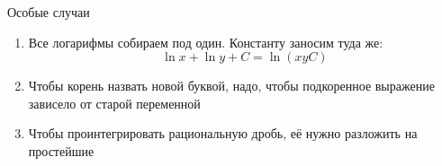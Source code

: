 \begin{undefthm}{Особые случаи}
\begin{enumerate}
\begin{enumerate}
\begin{itemize}
\begin{itemize}
\begin{enumerate}
                    \end{enumerate}
                \end{itemize}
            \end{itemize}
        \end{enumerate}
        \item Все логарифмы собираем под один. Константу заносим туда же:
        $$ \ln x + \ln y + C = \ln(xyC) $$
        \item Чтобы корень назвать новой буквой, надо, чтобы подкоренное выражение  зависело от старой переменной
        \item Чтобы проинтегрировать рациональную дробь, её нужно разложить на простейшие
    \end{enumerate}
\end{undefthm}
